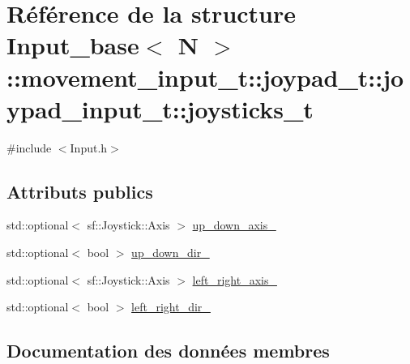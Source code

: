 \hypertarget{struct_input__base_1_1movement__input__t_1_1joypad__t_1_1joypad__input__t_1_1joysticks__t}{}\section{Référence de la structure Input\+\_\+base$<$ N $>$\+:\+:movement\+\_\+input\+\_\+t\+:\+:joypad\+\_\+t\+:\+:joypad\+\_\+input\+\_\+t\+:\+:joysticks\+\_\+t}
\label{struct_input__base_1_1movement__input__t_1_1joypad__t_1_1joypad__input__t_1_1joysticks__t}


{\ttfamily \#include $<$Input.\+h$>$}

\subsection*{Attributs publics}
\begin{DoxyCompactItemize}
\item 
std\+::optional$<$ sf\+::\+Joystick\+::\+Axis $>$ \hyperlink{struct_input__base_1_1movement__input__t_1_1joypad__t_1_1joypad__input__t_1_1joysticks__t_a4e946e682eb9f4a058fa817fade0bf24}{up\+\_\+down\+\_\+axis\+\_\+}
\item 
std\+::optional$<$ bool $>$ \hyperlink{struct_input__base_1_1movement__input__t_1_1joypad__t_1_1joypad__input__t_1_1joysticks__t_a70ec58fb91a56fc7679773b4b4b595f7}{up\+\_\+down\+\_\+dir\+\_\+}
\item 
std\+::optional$<$ sf\+::\+Joystick\+::\+Axis $>$ \hyperlink{struct_input__base_1_1movement__input__t_1_1joypad__t_1_1joypad__input__t_1_1joysticks__t_a917317cf8db099f7c2efb52dc1508f2d}{left\+\_\+right\+\_\+axis\+\_\+}
\item 
std\+::optional$<$ bool $>$ \hyperlink{struct_input__base_1_1movement__input__t_1_1joypad__t_1_1joypad__input__t_1_1joysticks__t_a70b62624b3e6e50f63072580e1525847}{left\+\_\+right\+\_\+dir\+\_\+}
\end{DoxyCompactItemize}


\subsection{Documentation des données membres}
\mbox{\label{struct_input__base_1_1movement__input__t_1_1joypad__t_1_1joypad__input__t_1_1joysticks__t_a917317cf8db099f7c2efb52dc1508f2d}} 
